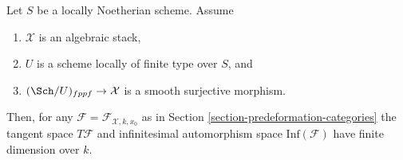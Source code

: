 %
\begin{lemma}
\label{lemma-finite-dimension}
Let $S$ be a locally Noetherian scheme. Assume
\begin{enumerate}
\item $\mathcal{X}$ is an algebraic stack,
\item $U$ is a scheme locally of finite type over $S$, and
\item $(\Sch/U)_{fppf} \to \mathcal{X}$ is a smooth surjective
morphism.
\end{enumerate}
Then, for any $\mathcal{F} = \mathcal{F}_{\mathcal{X}, k, x_0}$ as in
Section \ref{section-predeformation-categories}
the tangent space $T\mathcal{F}$ and infinitesimal automorphism space
$\text{Inf}(\mathcal{F})$ have finite dimension over $k$.
\end{lemma}

